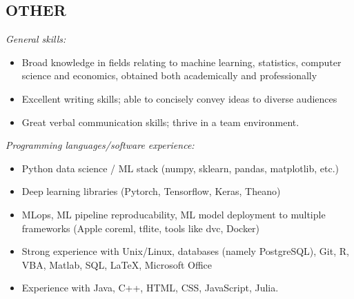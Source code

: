 \documentclass[margin]{res}
\begin{document}
\begin{resume}
		\section{OTHER}
		{\it General skills:}\vspace{3mm}
		\begin{itemize}
			\item Broad knowledge in fields relating to machine learning, statistics, computer science and economics, obtained both academically and professionally
			\item Excellent writing skills; able to concisely convey ideas to diverse audiences
			\item Great verbal communication skills; thrive in a team environment.
		\end{itemize}
		{\it Programming languages/software experience:}\vspace{3mm}
		\begin{itemize}
			\item Python data science / ML stack (numpy, sklearn, pandas, matplotlib, etc.)
			\item Deep learning libraries (Pytorch, Tensorflow, Keras, Theano)
			\item MLops, ML pipeline reproducability, ML model deployment to multiple frameworks (Apple coreml, tflite, tools like dvc, Docker)
			\item Strong experience with Unix/Linux, databases (namely PostgreSQL), Git, R, VBA, Matlab, SQL, \LaTeX, Microsoft Office
			\item Experience with Java, C++, HTML, CSS, JavaScript, Julia.
		\end{itemize}
		
	\end{resume}
	
\end{document}
